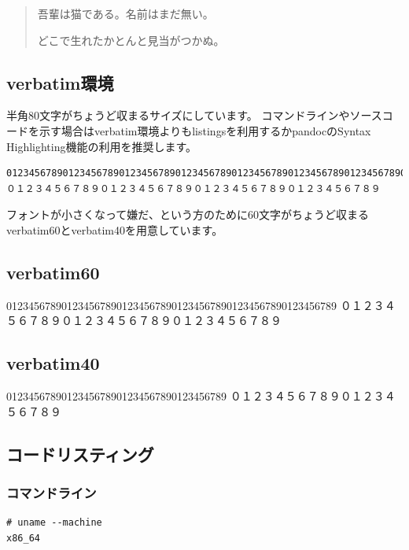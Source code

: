 \begin{quote}
吾輩は猫である。名前はまだ無い。

どこで生れたかとんと見当がつかぬ。
\end{quote}

\subsection{verbatim環境}

半角80文字がちょうど収まるサイズにしています。
コマンドラインやソースコードを示す場合はverbatim環境よりもlistingsを利用するかpandocのSyntax Highlighting機能の利用を推奨します。

\begin{verbatim}
01234567890123456789012345678901234567890123456789012345678901234567890123456789
０１２３４５６７８９０１２３４５６７８９０１２３４５６７８９０１２３４５６７８９
\end{verbatim}

フォントが小さくなって嫌だ、という方のために60文字がちょうど収まるverbatim60とverbatim40を用意しています。

\subsection{verbatim60}

\begin{verbatim60}
012345678901234567890123456789012345678901234567890123456789
０１２３４５６７８９０１２３４５６７８９０１２３４５６７８９
\end{verbatim60}

\subsection{verbatim40}

\begin{verbatim40}
0123456789012345678901234567890123456789
０１２３４５６７８９０１２３４５６７８９
\end{verbatim40}

\subsection{コードリスティング}

\subsubsection{コマンドライン}
\begin{lstlisting}[language=command]
# uname --machine
x86_64
\end{lstlisting}

